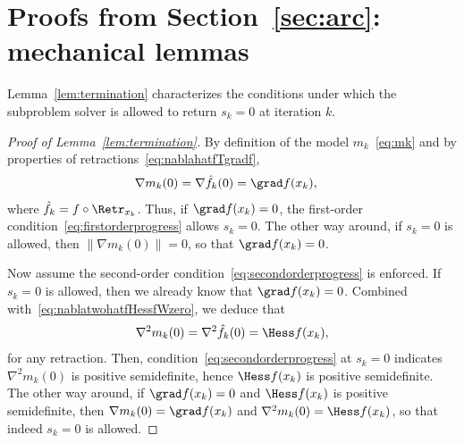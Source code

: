 \clearpage

\appendix 

\section{Proofs from Section~\ref{sec:arc}: mechanical lemmas} \label{app:arc}

Lemma~\ref{lem:termination} characterizes the conditions under which the subproblem solver is allowed to return $s_k = 0$ at iteration $k$.
\begin{proof}[Proof of Lemma~\ref{lem:termination}]
	By definition of the model $m_k$~\eqref{eq:mk} and by properties of retractions~\eqref{eq:nablahatfTgradf},
	\begin{align*}
	\nabla m_k(0) & = \nabla \hat f_k(0) = \grad f(x_k),
	\end{align*}
	where $\hat f_k = f \circ \Retr_{x_k}$.
	Thus, if $\grad f(x_k) = 0$, the first-order condition~\eqref{eq:firstorderprogress} allows $s_k = 0$. The other way around, if $s_k = 0$ is allowed, then $\|\nabla m_k(0)\| = 0$, so that $\grad f(x_k) = 0$.
	
	Now assume the second-order condition~\eqref{eq:secondorderprogress} is enforced. If $s_k = 0$ is allowed, then we already know that $\grad f(x_k) = 0$. Combined with~\eqref{eq:nablatwohatfHessfWzero}, we deduce that
	\begin{align*}
	\nabla^2 m_k(0) = \nabla^2 \hat f_k(0) = \Hess f(x_k),
	\end{align*}
	for any retraction. Then, condition~\eqref{eq:secondorderprogress} at $s_k = 0$ indicates $\nabla^2 m_k(0)$ is positive semidefinite, hence $\Hess f(x_k)$ is positive semidefinite. The other way around, if $\grad f(x_k) = 0$ and $\Hess f(x_k)$ is positive semidefinite, then $\nabla m_k(0) = \grad f(x_k)$ and $\nabla^2 m_k(0) = \Hess f(x_k)$, so that indeed $s_k = 0$ is allowed.
\end{proof}

